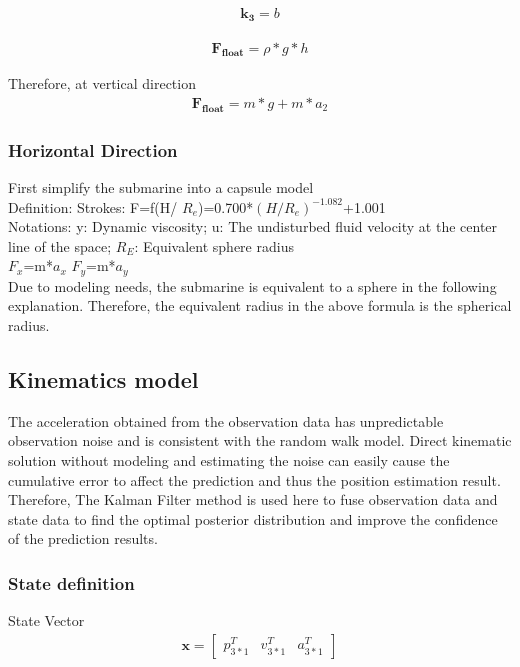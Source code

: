 \documentclass[12pt]{article}  %
\begin{document}
\begin{equation}
    \begin{aligned}
\mathbf{k_3}=b
\end{aligned}
\end{equation}

\begin{equation}
    \begin{aligned}
\mathbf{F_{float}}=\rho*g*h
\end{aligned}
\end{equation}

\indent Therefore, at vertical direction
\begin{equation}
    \begin{aligned}
\mathbf{F_{float}}=m*g+m*a_2
\end{aligned}
\end{equation}

\subsubsection{Horizontal Direction}
\indent First simplify the submarine into a capsule model\\
\indent Definition: Strokes: F=f(H/ $R_e$)=0.700*$\left(H/ R_e\right)^{-1.082}$+1.001\\
\indent Notations: y: Dynamic viscosity; u: The undisturbed fluid velocity at the center line 
of the space; $R_E$: Equivalent sphere radius\\
\indent $F_x$=m*$a_x$ $F_y$=m*$a_y$ \\
\indent Due to modeling needs, the submarine is equivalent to a sphere in the following explanation. Therefore, the equivalent radius in the above formula is the spherical radius.

\subsection{Kinematics model}
\indent The acceleration obtained from the observation data has unpredictable observation noise and is consistent with the random walk model. 
Direct kinematic solution without modeling and estimating the noise can easily cause the cumulative error to affect the prediction and thus the position estimation result. Therefore, The Kalman Filter method is used here to fuse observation data and state data to find the optimal posterior distribution and improve the confidence of the prediction results.

\subsubsection{State definition}
\indent State Vector
\begin{equation} 
    \begin{aligned}
  \mathbf{x}=
  \begin{bmatrix}
    p^T_{3*1}&v^T_{3*1}&a^T_{3*1}
  \end{bmatrix}
\end{aligned}
\end{equation}
\end{document}
